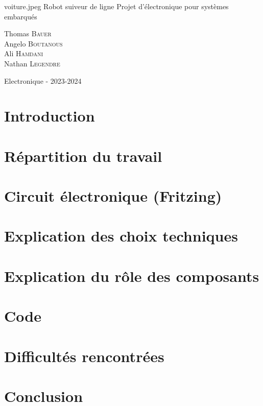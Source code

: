 \documentclass[12pt,a4paper]{article}
\begin{document}
\PageDeGarde
{voiture.jpeg} %
{Robot suiveur de ligne} %
{Projet d'électronique pour systèmes embarqués} %
{

Thomas \textsc{Bauer}\\
Angelo \textsc{Boutanous}\\
Ali \textsc{Hamdani}\\
Nathan \textsc{Legendre}\\

} %
{Electronique - 2023-2024} %


\newpage

\tableofcontents

\newpage

\section*{Introduction}


\section{Répartition du travail}


\section{Circuit électronique (Fritzing)}


\section{Explication des choix techniques}


\section{Explication du rôle des composants}


\section{Code}


\section{Difficultés rencontrées}


\section{Conclusion}


\listoffigures
\end{document}
